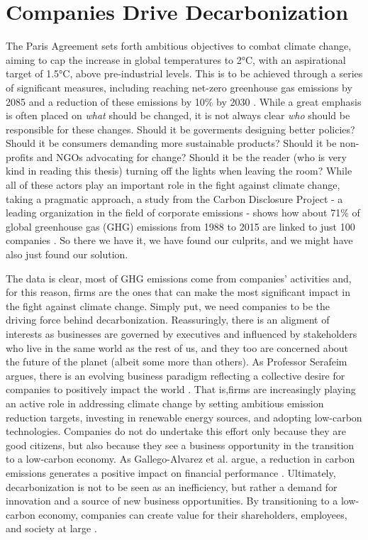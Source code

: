 \section{Companies Drive Decarbonization}
\noindent The Paris Agreement sets forth ambitious objectives to combat climate change, aiming to cap the increase in global temperatures to 2°C, with an aspirational target of 1.5°C, above pre-industrial levels. This is to be achieved through a series of significant measures, including reaching net-zero greenhouse gas emissions by 2085 and a reduction of these emissions by 10\% by 2030 \cite{Sanderson2016What}. While a great emphasis is often placed on \textit{what} should be changed, it is not always clear \textit{who} should be responsible for these changes. Should it be goverments designing better policies? Should it be consumers demanding more sustainable products? Should it be non-profits and NGOs advocating for change? Should it be the reader (who is very kind in reading this thesis)  turning off the lights when leaving the room? While all of these actors play an important role in the fight against climate change, taking a pragmatic approach, a study from the Carbon Disclosure Project - a leading organization in the field of corporate emissions - shows how about 71\% of global greenhouse gas (GHG) emissions from 1988 to 2015 are linked to just 100 companies \cite{Cdp2017}. So there we have it, we have found our culprits, and we might have also just found our solution. 

The data is clear, most of GHG emissions come from companies' activities and, for this reason, firms are the ones that can make the most significant impact in the fight against climate change. Simply put, we need companies to be the driving force behind decarbonization. Reassuringly, there is an aligment of interests as businesses are governed by executives and influenced by stakeholders who live in the same world as the rest of us, and they too are concerned about the future of the planet (albeit some more than others). As Professor Serafeim argues, there is an evolving business paradigm reflecting a collective desire for companies to positively impact the world \cite{purpose+profit}. That is,firms are increasingly playing an active role in addressing climate change by setting ambitious emission reduction targets, investing in renewable energy sources, and adopting low-carbon technologies. Companies do not do undertake this effort only because they are good citizens, but also because they see a business opportunity in the transition to a low-carbon economy. As Gallego-Alvarez et al. argue, a reduction in carbon emissions generates a positive impact on financial performance \cite{Gallego}.
Ultimately, decarbonization is not to be seen as an inefficiency, but rather a demand for innovation and a source of new business opportunities. By transitioning to a low-carbon economy, companies can create value for their shareholders, employees, and society at large \cite{purpose+profit}. 


